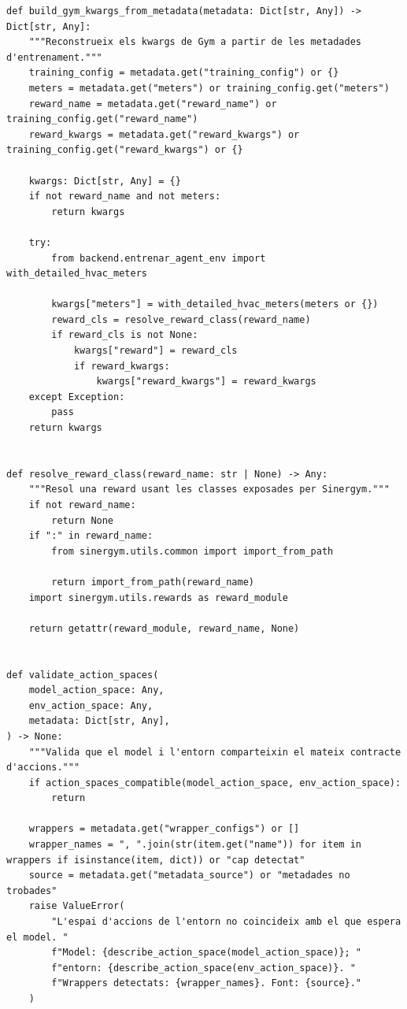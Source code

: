 \documentclass[10pt,a4paper]{article}
\begin{document}
\begin{lstlisting}[style=studioPython,caption={backend/model\_metadata.py},label={lst:backend-model-metadata-py}]
def build_gym_kwargs_from_metadata(metadata: Dict[str, Any]) -> Dict[str, Any]:
    """Reconstrueix els kwargs de Gym a partir de les metadades d'entrenament."""
    training_config = metadata.get("training_config") or {}
    meters = metadata.get("meters") or training_config.get("meters")
    reward_name = metadata.get("reward_name") or training_config.get("reward_name")
    reward_kwargs = metadata.get("reward_kwargs") or training_config.get("reward_kwargs") or {}

    kwargs: Dict[str, Any] = {}
    if not reward_name and not meters:
        return kwargs

    try:
        from backend.entrenar_agent_env import with_detailed_hvac_meters

        kwargs["meters"] = with_detailed_hvac_meters(meters or {})
        reward_cls = resolve_reward_class(reward_name)
        if reward_cls is not None:
            kwargs["reward"] = reward_cls
            if reward_kwargs:
                kwargs["reward_kwargs"] = reward_kwargs
    except Exception:
        pass
    return kwargs


def resolve_reward_class(reward_name: str | None) -> Any:
    """Resol una reward usant les classes exposades per Sinergym."""
    if not reward_name:
        return None
    if ":" in reward_name:
        from sinergym.utils.common import import_from_path

        return import_from_path(reward_name)
    import sinergym.utils.rewards as reward_module

    return getattr(reward_module, reward_name, None)


def validate_action_spaces(
    model_action_space: Any,
    env_action_space: Any,
    metadata: Dict[str, Any],
) -> None:
    """Valida que el model i l'entorn comparteixin el mateix contracte d'accions."""
    if action_spaces_compatible(model_action_space, env_action_space):
        return

    wrappers = metadata.get("wrapper_configs") or []
    wrapper_names = ", ".join(str(item.get("name")) for item in wrappers if isinstance(item, dict)) or "cap detectat"
    source = metadata.get("metadata_source") or "metadades no trobades"
    raise ValueError(
        "L'espai d'accions de l'entorn no coincideix amb el que espera el model. "
        f"Model: {describe_action_space(model_action_space)}; "
        f"entorn: {describe_action_space(env_action_space)}. "
        f"Wrappers detectats: {wrapper_names}. Font: {source}."
    )
\end{lstlisting}
\end{document}
